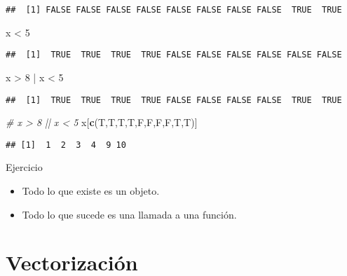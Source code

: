\documentclass[]{article}
\newenvironment{Shaded}{\begin{snugshade}}{\end{snugshade}}
\newcommand{\KeywordTok}[1]{\textcolor[rgb]{0.13,0.29,0.53}{\textbf{{#1}}}}
\newcommand{\DecValTok}[1]{\textcolor[rgb]{0.00,0.00,0.81}{{#1}}}
\newcommand{\StringTok}[1]{\textcolor[rgb]{0.31,0.60,0.02}{{#1}}}
\newcommand{\CommentTok}[1]{\textcolor[rgb]{0.56,0.35,0.01}{\textit{{#1}}}}
\newcommand{\NormalTok}[1]{{#1}}
\begin{document}
\begin{verbatim}
##  [1] FALSE FALSE FALSE FALSE FALSE FALSE FALSE FALSE  TRUE  TRUE
\end{verbatim}

\begin{Shaded}
\begin{Highlighting}[]
\NormalTok{x <}\StringTok{ }\DecValTok{5}
\end{Highlighting}
\end{Shaded}

\begin{verbatim}
##  [1]  TRUE  TRUE  TRUE  TRUE FALSE FALSE FALSE FALSE FALSE FALSE
\end{verbatim}

\begin{Shaded}
\begin{Highlighting}[]
\NormalTok{x >}\StringTok{ }\DecValTok{8} \NormalTok{|}\StringTok{ }\NormalTok{x <}\StringTok{ }\DecValTok{5}
\end{Highlighting}
\end{Shaded}

\begin{verbatim}
##  [1]  TRUE  TRUE  TRUE  TRUE FALSE FALSE FALSE FALSE  TRUE  TRUE
\end{verbatim}

\begin{Shaded}
\begin{Highlighting}[]
\CommentTok{# x > 8 || x < 5}
\NormalTok{x[}\KeywordTok{c}\NormalTok{(T,T,T,T,F,F,F,F,T,T)]}
\end{Highlighting}
\end{Shaded}

\begin{verbatim}
## [1]  1  2  3  4  9 10
\end{verbatim}

\begin{nota}[|| vs. | y && vs. &]

\end{nota}

\renewcommand\bcStyleTitre[1]{\large\textcolor{bbblack}{#1}}

\begin{bclogo}[
  couleur=llred,
  arrondi=0,
  logo=\bcstop,
  barre=none,
  noborder=true]{Ejercicio}
\begin{itemize}
\item Todo lo que existe es un objeto.
\item Todo lo que sucede es una llamada a una función.
\end{itemize}
\end{bclogo}

\section{Vectorización}\label{vectorizacion}
\end{document}
